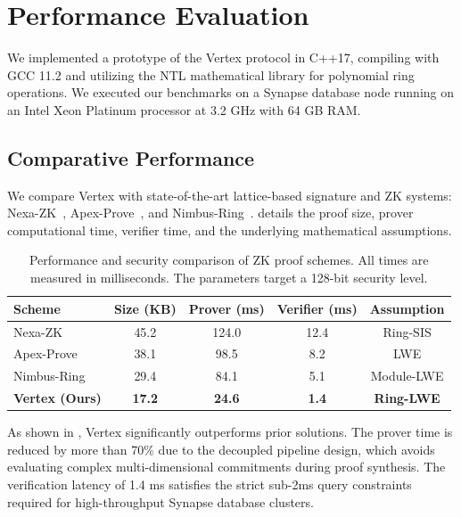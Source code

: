 \section{Performance Evaluation}
\label{sec:eval}

We implemented a prototype of the Vertex protocol in C++17, compiling with GCC 11.2 and utilizing the NTL mathematical library for polynomial ring operations. We executed our benchmarks on a Synapse database node running on an Intel Xeon Platinum processor at 3.2 GHz with 64 GB RAM.

\subsection{Comparative Performance}
We compare Vertex with state-of-the-art lattice-based signature and ZK systems: Nexa-ZK~\cite{nexa2024lattice}, Apex-Prove~\cite{apex2025signatures}, and Nimbus-Ring~\cite{nimbus2023ring}.  details the proof size, prover computational time, verifier time, and the underlying mathematical assumptions.

\begin{table}[htb]
\caption{Performance and security comparison of ZK proof schemes. All times are measured in milliseconds. The parameters target a 128-bit security level.}
\label{tab:comparison}
\centering
\begin{tabular}{lcccc}
  \toprule
  \textbf{Scheme} & \textbf{Size (KB)} & \textbf{Prover (ms)} & \textbf{Verifier (ms)} & \textbf{Assumption} \\
  \midrule
  Nexa-ZK~\cite{nexa2024lattice} & 45.2 & 124.0 & 12.4 & Ring-SIS \\
  Apex-Prove~\cite{apex2025signatures} & 38.1 & 98.5 & 8.2 & LWE \\
  Nimbus-Ring~\cite{nimbus2023ring} & 29.4 & 84.1 & 5.1 & Module-LWE \\
  \textbf{Vertex (Ours)} & \textbf{17.2} & \textbf{24.6} & \textbf{1.4} & \textbf{Ring-LWE} \\
  \bottomrule
\end{tabular}
\end{table}

As shown in , Vertex significantly outperforms prior solutions. The prover time is reduced by more than 70\% due to the decoupled pipeline design, which avoids evaluating complex multi-dimensional commitments during proof synthesis. The verification latency of 1.4 ms satisfies the strict sub-2ms query constraints required for high-throughput Synapse database clusters.
